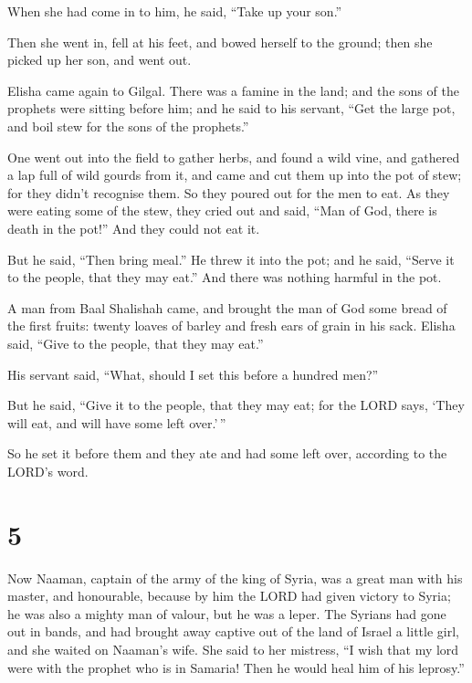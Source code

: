 When she had come in to him, he said, ``Take up your son.''

 Then she went in, fell at his feet, and bowed herself to
the ground; then she picked up her son, and went out.

 Elisha came again to Gilgal. There was a famine in the
land; and the sons of the prophets were sitting before him; and he said
to his servant, ``Get the large pot, and boil stew for the sons of the
prophets.''

 One went out into the field to gather herbs, and found a
wild vine, and gathered a lap full of wild gourds from it, and came and
cut them up into the pot of stew; for they didn't recognise them.
 So they poured out for the men to eat. As they were
eating some of the stew, they cried out and said, ``Man of God, there is
death in the pot!'' And they could not eat it.

 But he said, ``Then bring meal.'' He threw it into the
pot; and he said, ``Serve it to the people, that they may eat.'' And
there was nothing harmful in the pot.

 A man from Baal Shalishah came, and brought the man of
God some bread of the first fruits: twenty loaves of barley and fresh
ears of grain in his sack. Elisha said, ``Give to the people, that they
may eat.''

 His servant said, ``What, should I set this before a
hundred men?''

But he said, ``Give it to the people, that they may eat; for the LORD
says, `They will eat, and will have some left over.'\,''

 So he set it before them and they ate and had some left
over, according to the LORD's word.

\hypertarget{section-4}{%
\section{5}\label{section-4}}

 Now Naaman, captain of the army of the king of Syria, was
a great man with his master, and honourable, because by him the LORD had
given victory to Syria; he was also a mighty man of valour, but he was a
leper.  The Syrians had gone out in bands, and had brought
away captive out of the land of Israel a little girl, and she waited on
Naaman's wife.  She said to her mistress, ``I wish that my
lord were with the prophet who is in Samaria! Then he would heal him of
his leprosy.''

